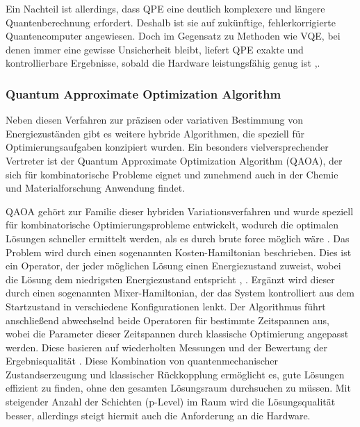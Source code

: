Ein Nachteil ist allerdings, dass QPE eine deutlich komplexere und längere Quantenberechnung erfordert. Deshalb ist sie auf zukünftige, fehlerkorrigierte Quantencomputer angewiesen. Doch im Gegensatz zu Methoden wie VQE, bei denen immer eine gewisse Unsicherheit bleibt, liefert QPE exakte und kontrollierbare Ergebnisse, sobald die Hardware leistungsfähig genug ist \citealp[7]{vonburgQuantumComputingEnhanced2021},\citealp[25]{mottaEmergingQuantumComputing2022}.



\subsubsection*{Quantum Approximate Optimization Algorithm}

Neben diesen Verfahren zur präzisen oder variativen Bestimmung von Energiezuständen gibt es weitere hybride Algorithmen, die speziell für Optimierungsaufgaben konzipiert wurden. Ein besonders vielversprechender Vertreter ist der Quantum Approximate Optimization Algorithm (QAOA), der sich für kombinatorische Probleme eignet und zunehmend auch in der Chemie und Materialforschung Anwendung findet.

QAOA gehört zur Familie dieser hybriden Variationsverfahren und wurde speziell für kombinatorische Optimierungsprobleme entwickelt, wodurch die optimalen Lösungen schneller ermittelt werden, als es durch brute force möglich wäre \citealp[3]{guoHarnessingQuantumPower2024}. Das Problem wird durch einen sogenannten Kosten-Hamiltonian beschrieben. Dies ist ein Operator, der jeder möglichen Lösung einen Energiezustand zuweist, wobei die Lösung dem niedrigsten Energiezustand entspricht \citealp[24]{mottaEmergingQuantumComputing2022}, \citealp[8]{guoHarnessingQuantumPower2024}. Ergänzt wird dieser durch einen sogenannten Mixer-Hamiltonian, der das System kontrolliert aus dem Startzustand in verschiedene Konfigurationen lenkt. Der Algorithmus führt anschließend abwechselnd beide Operatoren für bestimmte Zeitspannen aus, wobei die Parameter dieser Zeitspannen durch klassische Optimierung angepasst werden. Diese basieren auf wiederholten Messungen und der Bewertung der Ergebnisqualität \citealp[8]{guoHarnessingQuantumPower2024}.
Diese Kombination von quantenmechanischer Zustandserzeugung und klassischer Rückkopplung ermöglicht es, gute Lösungen effizient zu finden, ohne den gesamten Lösungsraum durchsuchen zu müssen. Mit steigender Anzahl der Schichten (p-Level) im Raum wird die Lösungsqualität besser, allerdings steigt hiermit auch die Anforderung an die Hardware.

